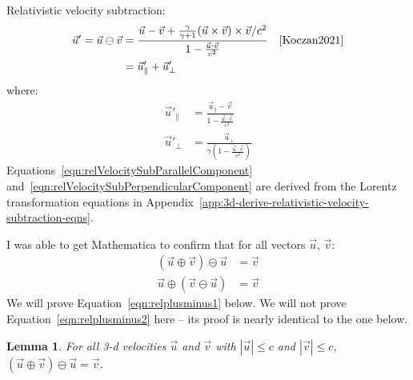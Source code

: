 \documentclass[a4paper]{article}
\theoremstyle{plain}
\newtheorem{lemma}[theorem]{Lemma}
\theoremstyle{definition}
\newcommand{\vect}[1]{\vec{#1}}
\begin{document}
Relativistic velocity subtraction:
\begin{align}
\vect{u}' = \vect{u} \ominus \vect{v}
  & = \frac{ \vect{u} - \vect{v} + \frac{\gamma}{\gamma+1} (\vect{u} \times \vect{v}) \times \vect{v} / c^2 }
           { 1 - \frac{\vect{u} \cdot \vect{v}}{c^2} } & & \text{\cite{Koczan2021}} \\
  & = \vect{u}'_{\parallel} + \vect{u}'_{\perp} \label{eqn:relVelocitySubComponents}
\end{align}
where:
\begin{align}
\vect{u}'_{\parallel}
  & = \frac{ \vect{u}_{\parallel} - \vect{v}}{1 - \frac{ \vect{u} \cdot \vect{v}}{c^2} } \label{eqn:relVelocitySubParallelComponent} \\
\vect{u}'_{\perp}
  & = \frac{ \vect{u}_{\perp} }{\gamma (1 - \frac{ \vect{u} \cdot \vect{v}}{c^2} )} \label{eqn:relVelocitySubPerpendicularComponent}
\end{align}
Equations~\eqref{eqn:relVelocitySubParallelComponent}
and~\eqref{eqn:relVelocitySubPerpendicularComponent}
are derived from the Lorentz transformation equations
in Appendix~\ref{app:3d-derive-relativistic-velocity-subtraction-eqns}.

I was able to get Mathematica to confirm that
for all vectors $\vect{u}$, $\vect{v}$:
\begin{align}
(\vect{u} \oplus \vect{v}) \ominus \vect{u} & = \vect{v} \label{eqn:relplusminus1} \\
\vect{u} \oplus (\vect{v} \ominus \vect{u}) & = \vect{v} \label{eqn:relplusminus2}
\end{align}
We will prove Equation~\eqref{eqn:relplusminus1} below.
We will not prove Equation~\eqref{eqn:relplusminus2} here --
its proof is nearly identical to the one below.

\begin{lemma}
\label{lem:3d-relplusminus1-holds}
For all 3-d velocities $\vect{u}$ and $\vect{v}$ with
$|\vect{u}| \leq c$ and $|\vect{v}| \leq c$,
$(\vect{u} \oplus \vect{v}) \ominus \vect{u} = \vect{v}$.
\end{lemma}
\end{document}
